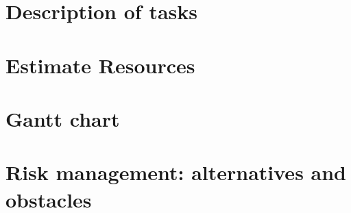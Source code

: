 \chapter{Description of tasks}

\chapter{Estimate Resources}

\chapter{Gantt chart}

\chapter{Risk management: alternatives and obstacles}
